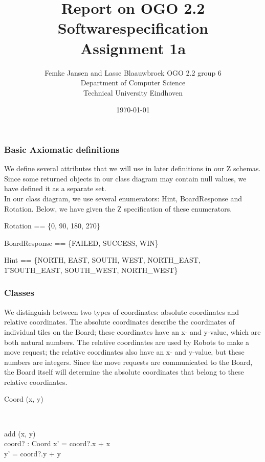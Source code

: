 \documentclass[12pt]{article}
\title{Report on OGO 2.2 Softwarespecification\\ Assignment 1a}
\author{
        Femke Jansen and Lasse Blaauwbroek OGO 2.2 group 6 \\
                Department of Computer Science\\
        Technical University Eindhoven\\
}
\date{\today}
\begin{document}
\maketitle

\subsubsection{Basic Axiomatic definitions}
We define several attributes that we will use in later definitions in our Z schemas. Since some returned objects in our class diagram may contain null values, we have defined it as a separate set. \\
In our class diagram, we use several enumerators: Hint, BoardResponse and Rotation. Below, we have given the Z specification of these enumerators.

\begin{axdef}
Rotation == \{0, 90, 180, 270\}
\end{axdef}

\begin{axdef}
BoardResponse == \{FAILED, SUCCESS, WIN\}
\end{axdef}

\begin{axdef}
Hint == \{NORTH, EAST, SOUTH, WEST, NORTH\_EAST, \\ \t1 SOUTH\_EAST, SOUTH\_WEST, NORTH\_WEST\}
\end{axdef}

\begin{zed}
[Null]
\end{zed}

\subsubsection{Classes}
We distinguish between two types of coordinates: absolute coordinates and relative coordinates. The absolute coordinates describe the coordinates of individual tiles on the Board; these coordinates have an x- and y-value, which are both natural numbers. The relative coordinates are used by Robots to make a move request; the relative coordinates also have an x- and y-value, but these numbers are integers. Since the move requests are communicated to the Board, the Board itself will determine the absolute coordinates that belong to these relative coordinates.

\begin{class}{Coord}
\upharpoonright (x, y) \\
 \\
\begin{schema}{add}
\Delta (x, y) \\
coord? : Coord
\where
x' = coord?.x + x \\
y' = coord?.y + y
\end{schema}
\end{class}
\end{document}
